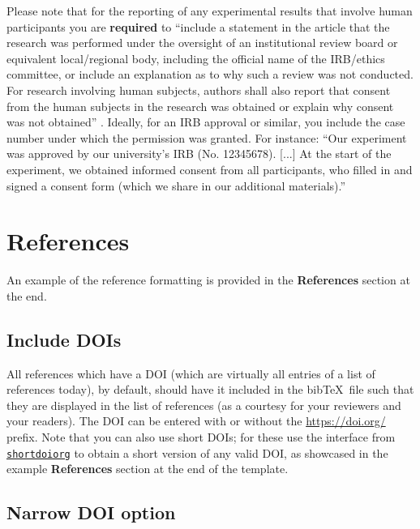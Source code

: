\documentclass[journal]{vgtc}                     %
\begin{document}
Please note that for the reporting of any experimental results that involve human participants you are \textbf{required} to ``include a statement in the article that the research was performed under the oversight of an institutional review board or equivalent local/regional body, including the official name of the IRB/ethics committee, or include an explanation as to why such a review was not conducted. For research involving human subjects, authors shall also report that consent from the human subjects in the research was obtained or explain why consent was not obtained'' \cite[Section 8.1.1.E]{IEEEPublications2025}. Ideally, for an IRB approval or similar, you include the case number under which the permission was granted. For instance:
``Our experiment was approved by our university's IRB (No. 12345678). [...] At the start of the experiment, we obtained informed consent from all participants, who filled in and signed a consent form (which we share in our additional materials).''

\section{References}
\label{sec:references_inst}

An example of the reference formatting is provided in the \textbf{References} section at the end.


\subsection{Include DOIs}
\label{sec:references_inst:doi}

All references which have a DOI (which are virtually all entries of a list of references today), by default, should have it included in the bib\TeX\ file such that they are displayed in the list of references (as a courtesy for your reviewers and your readers).
The DOI can be entered with or without the \url{https://doi.org/} prefix. Note that you can also use short DOIs; for these use the interface from \href{https://shortdoi.org/}{\texttt{shortdoiorg}} to obtain a short version of any valid DOI, as showcased in the example \textbf{References} section at the end of the template.

\subsection{Narrow DOI option}
\end{document}
